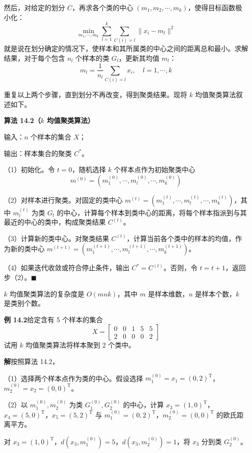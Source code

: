 \documentclass[UTF8, 12pt, fontset=fandol, oneside]{ctexart}
\begin{document}
然后，对给定的划分 $C$，再求各个类的中心 $(m_1,m_2,\cdots,m_k)$，使得目标函数极小化：
\[
\min_{m_1,\cdots,m_k}\sum_{l=1}^k\sum_{C(i)=l}\|x_i-m_l\|^2
\]
就是说在划分确定的情况下，使样本和其所属类的中心之间的距离总和最小。求解结果，对于每个包含 $n_l$ 个样本的类 $G_l$，更新其均值 $m_l$：
\[
m_l=\frac{1}{n_l}\sum_{C(i)=l}x_i,\quad l=1,\cdots,k
\]

重复以上两个步骤，直到划分不再改变，得到聚类结果。现将 $k$ 均值聚类算法叙述如下。

\noindent\textbf{算法 14.2（$k$ 均值聚类算法）}

输入：$n$ 个样本的集合 $X$；

输出：样本集合的聚类 $C^*$。

（1）初始化。令 $t=0$，随机选择 $k$ 个样本点作为初始聚类中心
\[
m^{(0)}=(m_1^{(0)},\cdots,m_l^{(0)},\cdots,m_k^{(0)})
\]

（2）对样本进行聚类。对固定的类中心 $m^{(t)}=(m_1^{(t)},\cdots,m_l^{(t)},\cdots,m_k^{(t)})$，其中 $m_l^{(t)}$ 为类 $G_l$ 的中心，计算每个样本到类中心的距离，将每个样本指派到与其最近的中心的类中，构成聚类结果 $C^{(t)}$。

（3）计算新的类中心。对聚类结果 $C^{(t)}$，计算当前各个类中的样本的均值，作为新的类中心 $m^{(t+1)}=(m_1^{(t+1)},\cdots,m_l^{(t+1)},\cdots,m_k^{(t+1)})$。

（4）如果迭代收敛或符合停止条件，输出 $C^*=C^{(t)}$。否则，令 $t=t+1$，返回步（2）。\hfill$\blacksquare$

$k$ 均值聚类算法的复杂度是 $O(mnk)$，其中 $m$ 是样本维数，$n$ 是样本个数，$k$ 是类别个数。

\noindent\textbf{例 14.2}\quad 给定含有 5 个样本的集合
\[
X=
\begin{bmatrix}
0 & 0 & 1 & 5 & 5\\
2 & 0 & 0 & 0 & 2
\end{bmatrix}
\]
试用 $k$ 均值聚类算法将样本聚到 2 个类中。

\noindent\textbf{解}\quad 按照算法 14.2，

（1）选择两个样本点作为类的中心。假设选择 $m_1^{(0)}=x_1=(0,2)^{\mathrm{T}}$，$m_2^{(0)}=x_2=(0,0)^{\mathrm{T}}$。

（2）以 $m_1^{(0)},m_2^{(0)}$ 为类 $G_1^{(0)},G_2^{(0)}$ 的中心，计算 $x_3=(1,0)^{\mathrm{T}}$，$x_4=(5,0)^{\mathrm{T}}$，$x_5=(5,2)^{\mathrm{T}}$ 与 $m_1^{(0)}=(0,2)^{\mathrm{T}}$，$m_2^{(0)}=(0,0)^{\mathrm{T}}$ 的欧氏距离平方。

对 $x_3=(1,0)^{\mathrm{T}}$，$d(x_3,m_1^{(0)})=5$，$d(x_3,m_2^{(0)})=1$，将 $x_3$ 分到类 $G_2^{(0)}$。
\end{document}
